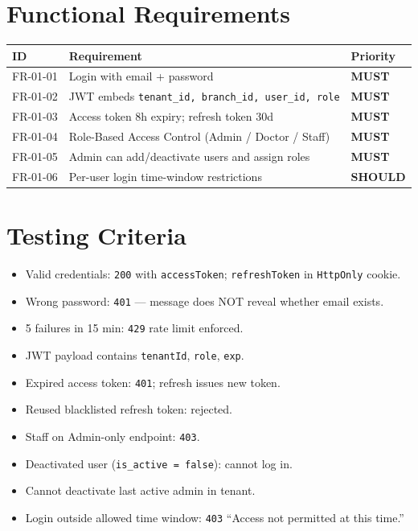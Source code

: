 \documentclass[12pt,a4paper]{report}
\newcommand{\must}{\colorbox{red!15}{\color{errorred}\textbf{\small MUST}}}
\newcommand{\should}{\colorbox{orange!15}{\color{warnorange}\textbf{\small SHOULD}}}
\newcommand{\testcheck}{\textcolor{successgreen}{\ding{51}}}
\begin{document}
\section{Functional Requirements}

\begin{longtable}{L{2.5cm} L{9cm} C{2cm}}
\toprule
\textbf{ID} & \textbf{Requirement} & \textbf{Priority} \\\midrule\endhead\bottomrule\endfoot
FR-01-01 & Login with email + password & \must \\
FR-01-02 & JWT embeds \texttt{tenant\_id, branch\_id, user\_id, role} & \must \\
FR-01-03 & Access token 8h expiry; refresh token 30d & \must \\
FR-01-04 & Role-Based Access Control (Admin / Doctor / Staff) & \must \\
FR-01-05 & Admin can add/deactivate users and assign roles & \must \\
FR-01-06 & Per-user login time-window restrictions & \should \\
\end{longtable}

\section{Testing Criteria}

\begin{itemize}
  \item[\testcheck] Valid credentials: \texttt{200} with \texttt{accessToken}; \texttt{refreshToken} in \texttt{HttpOnly} cookie.
  \item[\testcheck] Wrong password: \texttt{401} --- message does NOT reveal whether email exists.
  \item[\testcheck] 5 failures in 15 min: \texttt{429} rate limit enforced.
  \item[\testcheck] JWT payload contains \texttt{tenantId}, \texttt{role}, \texttt{exp}.
  \item[\testcheck] Expired access token: \texttt{401}; refresh issues new token.
  \item[\testcheck] Reused blacklisted refresh token: rejected.
  \item[\testcheck] Staff on Admin-only endpoint: \texttt{403}.
  \item[\testcheck] Deactivated user (\texttt{is\_active = false}): cannot log in.
  \item[\testcheck] Cannot deactivate last active admin in tenant.
  \item[\testcheck] Login outside allowed time window: \texttt{403} ``Access not permitted at this time.''
\end{itemize}
\end{document}
